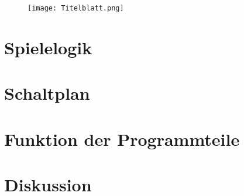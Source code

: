 \documentclass{article}
\begin{document}

    \begin{figure}[h!] %
		\texttt{[image: Titelblatt.png]}
	\end{figure}

    \section{Spielelogik}
    \section{Schaltplan}
    \section{Funktion der Programmteile} %
    \section{Diskussion}
    
    
    
\end{document}
